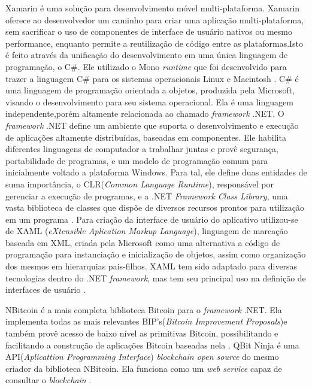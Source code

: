 \documentclass[
	article,			%
	11pt,				%
	oneside,			%
	a4paper,			%
	chapter=TITLE,		%
	section=TITLE,		%
	subsection=TITLE,	%
	subsubsection=TITLE, %
	english,			%
	brazil,				%
	sumario=tradicional
	]{ifrs-artigo-abntex2}
\begin{document}
Xamarin é uma solução para desenvolvimento móvel multi-plataforma. Xamarin oferece ao desenvolvedor um caminho para criar uma aplicação multi-plataforma, sem sacrificar o uso de componentes de interface de usuário nativos ou mesmo performance, enquanto permite a reutilização de código entre as plataformas.Isto é feito através da unificação do desenvolvimento em uma única linguagem de programação, o C{\#}. Ele utilizado o Mono \textit{runtime} que foi desenvolvido para trazer a linguagem C{\#} para os sistemas operacionais Linux e Macintosh \cite{dickson2013xamarin}.
C{\#} é uma linguagem de programação orientada a objetos, produzida pela Microsoft, visando o desenvolvimento para seu sistema operacional. Ela é uma linguagem independente,porém altamente relacionada ao chamado \textit{framework} .NET. O \textit{framework} .NET define um ambiente que suporta o desenvolvimento e execução de aplicações altamente distribuídas, baseadas em componentes. Ele habilita diferentes linguagens de computador a trabalhar juntas e provê segurança, portabilidade de programas, e um modelo de programação comum para inicialmente voltado a plataforma Windows. Para tal, ele define duas entidades de suma importância, o CLR(\textit{Common Language Runtime}), responsável por gerenciar a execução de programas, e a  .NET \textit{Framework Class Library}, uma vasta biblioteca de classes que dispõe de diversos recursos prontos para utilização em um programa \cite{schildt2010c}.
Para criação da interface de usuário do aplicativo utilizou-se de XAML (\textit{eXtensible Aplication Markup Language}), linguagem de marcação  baseada em XML, criada pela Microsoft como uma alternativa a código de programação para instanciação e inicialização de objetos, assim como organização dos mesmos em hierarquias pais-filhos. XAML tem sido adaptado para diversas tecnologias dentro do .NET \textit{framework}, mas tem seu principal uso na definição de interfaces de usuário \cite{xamarinDocs}.

NBitcoin é a mais completa biblioteca Bitcoin para o \textit{framework} .NET. Ela implementa todas as mais relevantes BIP's(\textit{Bitcoin Improvement Proposals})e também provê acesso de baixo nível as primitivas Bitcoin, possibilitando e facilitando a construção de aplicações Bitcoin baseadas nela \cite{nBitcoin}.
QBit Ninja é uma API(\textit{Aplicattion Programming Interface}) \textit{blockchain open source} do mesmo criador da biblioteca NBitcoin. Ela funciona como um \textit{web service} capaz de consultar o \textit{blockchain} \cite{qbitNinja}.
\end{document}
